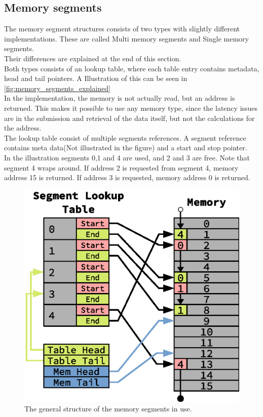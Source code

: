 \subsection{Memory segments} \label{subsec:memory_segments}
The memory segment structures consists of two types with slightly different
implementations. These are called Multi memory segments and Single memory
segments.
\\Their differences are explained at the end of this section.\\
Both types consists of an lookup table, where each table entry contains
metadata, head and tail pointers. A Illustration of this can be seen in
\autoref{fig:memory_segments_explained}\\
In the implementation, the memory is not actually read, but an address is
returned. This makes it possible to use any memory type, since the latency issues
are in the submission and retrieval of the data itself, but not the calculations
for the address.\\
The lookup table consist of multiple segments references. A segment reference
contains meta data(Not illustrated in the figure) and a start and stop pointer.\\
In the illustration segments 0,1 and 4 are used, and 2 and 3 are free. Note that
segment 4 wraps around. If address 2 is requested from segment 4, memory address
15 is returned. If address 3 is requested, memory address 0 is returned.\\
\begin{figure}
	\centering
	\includegraphics[width=\linewidth]{implementation/memory_segments.eps}
	\caption{The general structure of the memory segments in use.}
	\label{fig:memory_segments_explained}
\end{figure}

